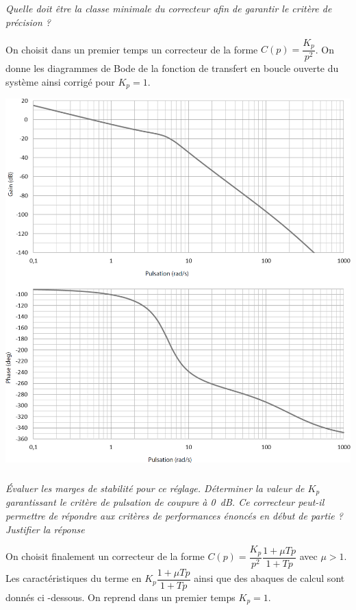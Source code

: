 \documentclass[10pt,fleqn]{article} %
\begin{document}
\begin{multicols}{2}
\subparagraph{}\textit{Quelle doit être la classe minimale du correcteur afin de garantir le critère de précision ?}
\ifprof
\begin{corrige}
\end{corrige}
\else
\fi

On choisit dans un premier temps un correcteur de la forme $C(p)=\dfrac{K_p}{p^2}$. On donne les diagrammes de Bode de la fonction de transfert en boucle ouverte du système ainsi corrigé pour $K_p =1$. 

\begin{center}
\includegraphics[width=.9\linewidth]{images/fig_04}
\end{center}

\subparagraph{}\textit{Évaluer les marges de stabilité pour ce réglage. Déterminer la valeur de $K_p$ garantissant le critère de pulsation de coupure à \SI{0}{dB}. Ce correcteur peut-il permettre de répondre aux critères de performances énoncés en début de partie ? Justifier la réponse}
\ifprof
\begin{corrige}
\end{corrige}
\else
\fi

On choisit finalement un correcteur de la forme $C(p)= \dfrac{K_p}{p^2}\dfrac{1+\mu Tp}{1+Tp}$ avec $\mu > 1$.
Les caractéristiques du terme en $K_p\dfrac{1+\mu Tp}{1+Tp}$  ainsi que des abaques de calcul sont donnés ci -dessous. On reprend dans un premier temps $K_p=1$. 


\end{multicols}
\end{document}
